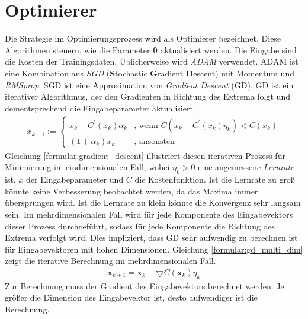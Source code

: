 \section{Optimierer}
Die Strategie im Optimierungsprozess wird als Optimierer bezeichnet.
Diese Algorithmen steuern, wie die Parameter $\boldsymbol\theta$ aktualisiert werden.
Die Eingabe sind die Kosten der Trainingsdaten.
Üblicherweise wird \textit{ADAM} verwendet.
ADAM ist eine Kombination aus \textit{SGD} (\textbf{S}tochastic \textbf{G}radient \textbf{D}escent) mit Momentum und \textit{RMSprop}.
\newline
\newline
SGD ist eine Approximation von \textit{Gradient Descent} (GD).
GD ist ein iterativer Algorithmus, der den Gradienten in Richtung des Extrema folgt und dementsprechend die Eingabeparameter aktualisiert.
\begin{align}
    \label{formular:gradient_descent}
    x_{k+1} := \begin{cases}
                   x_k - C^{\prime}(x_k)\alpha_k & \text{, wenn } C(x_k - C^{\prime}(x_k)\eta_k) < C(x_k)\\
                   (1 + \alpha_k)x_k & \text{, ansonsten}
    \end{cases}
\end{align}
Gleichung \ref{formular:gradient_descent} illustriert diesen iterativen Prozess für Minimierung im eindimensionalen Fall,
wobei $\eta_k > 0$ eine angemessene \textit{Lernrate} ist, $x$ der Eingabeparameter und $C$ die Kostenfunktion.
Ist die Lernrate zu groß könnte keine Verbesserung beobachtet werden, da das Maxima immer übersprungen wird.
Ist die Lernrate zu klein könnte die Konvergenz sehr langsam sein.
\newline
\newline
Im mehrdimensionalen Fall wird für jede Komponente des Eingabevektors dieser Prozess durchgeführt, sodass für jede Komponente
die Richtung des Extrema verfolgt wird.
Dies impliziert, dass GD sehr aufwendig zu berechnen ist für Eingabevektoren mit hohen Dimensionen.
Gleichung \ref{formular:gd_multi_dim} zeigt die iterative Berechnung im mehrdimensionalen Fall.
\begin{align}
    \label{formular:gd_multi_dim}
    \textbf{x}_{k+1} = \textbf{x}_k - \bigtriangledown C(\textbf{x}_k)\eta_k
\end{align}
Zur Berechnung muss der Gradient des Eingabevektors berechnet werden.
Je größer die Dimension des Eingabevektor ist, desto aufwendiger ist die Berechnung.
\newline
